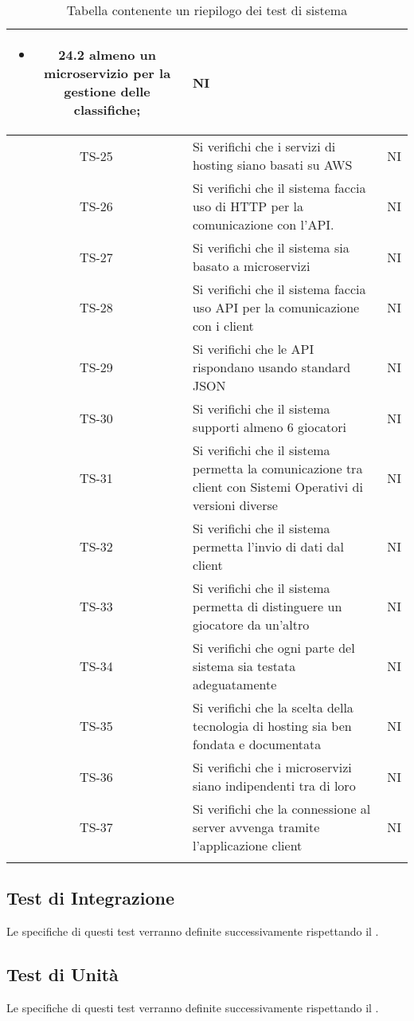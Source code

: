 \begin{center}
\begin{longtable}{|c|p{10cm}|c|}
\begin{itemize}
			 	\item\textbf{24.2} almeno un microservizio per la gestione delle classifiche;
			 \end{itemize}& NI \\
			 \hline
			 TS-25 & Si verifichi che i servizi di hosting siano basati su AWS & NI \\ 
			 \hline
			 TS-26 & Si verifichi che il sistema faccia uso di HTTP per la comunicazione con l'API. & NI \\
			 \hline
			 TS-27 & Si verifichi che il sistema sia basato a microservizi & NI \\
			 \hline
			 TS-28 & Si verifichi che il sistema faccia uso API per la comunicazione con i client & NI \\
			 \hline
			 TS-29 & Si verifichi che le API rispondano usando standard JSON & NI \\
			 \hline
			 TS-30 & Si verifichi che il sistema supporti almeno 6 giocatori & NI \\
			 \hline
			 TS-31 & Si verifichi che il sistema permetta la comunicazione tra client con Sistemi Operativi di versioni diverse & NI \\
			 \hline
			 TS-32 & Si verifichi che il sistema permetta l'invio di dati dal client& NI \\
			 \hline
			 TS-33 & Si verifichi che il sistema permetta di distinguere un giocatore da un'altro & NI \\
			 \hline
			 TS-34 & Si verifichi che ogni parte del sistema sia testata adeguatamente & NI \\
			 \hline
			 TS-35 & Si verifichi che la scelta della tecnologia di hosting sia ben fondata e documentata & NI \\
			 \hline
			 TS-36 & Si verifichi che i microservizi siano indipendenti tra di loro & NI \\ 
			 \hline
			 TS-37 & Si verifichi che la connessione al server avvenga tramite l'applicazione client & NI \\
			 \hline
			 \caption{Tabella contenente un riepilogo dei test di sistema}
			\end{longtable}
		\end{center}


	\subsection{Test di Integrazione}
		Le specifiche di questi test verranno definite successivamente rispettando il . 

	\subsection{Test di Unità}
	 	Le specifiche di questi test verranno definite successivamente rispettando il . 

